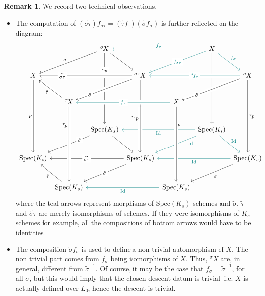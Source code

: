 \documentclass[10pt]{amsart}
\theoremstyle{definition}
\newtheorem{remark}[theorem]{Remark}
\newcommand{\Spe}{ {\mathrm{Spec} } }
\begin{document}
\begin{remark}
We record two technical observations.
\begin{itemize}
\item[\textnormal{(i)}] The computation of $ ( \widetilde{\sigma \tau } ) f_{  \sigma \tau} = (\widetilde{\tau} f_\tau)(\widetilde{\sigma} f_\sigma)$ is further reflected on the diagram: 
    \[
\begin{tikzcd}[row sep=2.5em, column sep=0.3em]
&&
{^\sigma\!X} 
 \arrow[ddd,swap,"{^\sigma \!p}" description,near start ] 
\arrow[dr] 
\arrow[dll,"\tilde{\sigma }",swap]
&&&
X   
 \arrow[lll,teal,swap,"f_\sigma"]  
 \arrow[dr,"f_\sigma  ", teal] 
 \arrow[ddd,"p"]
 \arrow[dll,"f_{\sigma \tau }" description, teal]
\\
 X 
 \arrow[rrr,<-,crossing over,"\widetilde{\sigma \tau }" description, near start] 
 \arrow[rd,<-,crossing over,"\tilde{\tau }"' ] 
 &&&
{^{\sigma\tau} \!X }  \ar[dd]
&&&  
{^\sigma \!X} 
  \arrow[ddd,"{^\sigma \!p}"] 
 \arrow[lll,teal, crossing over,"{^\sigma \!f_{\tau}}" description, swap]
 \arrow[dll,crossing over, "\tilde{\sigma}" description, near end]
\\
& {^\tau \! X} 
\arrow[rrr,<-,teal,"f_\tau" description,crossing over] 
\arrow[urr, <-, "\tilde{\sigma }" description, crossing over, near start]
& &  \;&  
X
\\ 
&& \Spe(K_s ) 
 \arrow[dr] 
 \arrow[dll,"\tilde{\sigma }" description,near start]
& \; && 
\Spe(K_s ) 
 \arrow[lll,"\mathrm{Id} ",teal] 
 \arrow[dr,"\mathrm{Id}",teal] 
 \arrow[dll,"\mathrm{Id}",teal,near start ]
\\
 \Spe(K_s  ) 
  \arrow[rrr,<-,"\widetilde{\sigma \tau}" description] 
  \arrow[uuu,<-,crossing over,"{p}" ]
  \arrow[dr,<-,"\tilde{\tau }"']   
&&& 
\Spe(K_s ) 
 \arrow[uu,<-,"{^{\sigma\tau} \!p} ",crossing over,near end] 
&&& 
 \Spe(K_s)
   \arrow[lll,"\mathrm{Id}",teal]
\\
&
\Spe(K_s ) 
 \arrow[uuu,<-,"{^{\tau} \!p} ",crossing over,near end]
 \arrow[urr,"\tilde{\sigma }" description,<-]
&&&
\Spe(K_s ) 
 \arrow[uuu,<-,"{p} ",crossing over,near end,swap]
 \arrow[urr,<-,"\tilde{\sigma }"']
 \arrow[lll,swap,teal,"\mathrm{Id}"']
\end{tikzcd}
\]
where the teal arrows represent morphisms of $\Spe(K_s)$-schemes and $\tilde{\sigma }$,  $\tilde{\tau}$ and ${\widetilde{\sigma \tau}}$ are merely isomorphisms of schemes. If they were isomorphisms of $K_s$-schemes for example, all the compositions of bottom arrows would have to be identities.

\item[\textnormal{(ii)}] The composition $\tilde{\sigma}f_\sigma$ is used to define a non trivial automorphism of $X$. The non trivial part comes from $f_\sigma$ being isomorphisms of $X$. Thus, ${^\sigma \!X}$ are, in general, different from $\tilde{\sigma}^{-1}$. Of course, it may be the case that $f_\sigma=\tilde{\sigma}^{-1}$, for all $\sigma$, but this would imply that the chosen descent datum is trivial, i.e. $X$ is actually defined over $L_0$, hence the descent is trivial. 
\end{itemize}
\end{remark}
\end{document}

